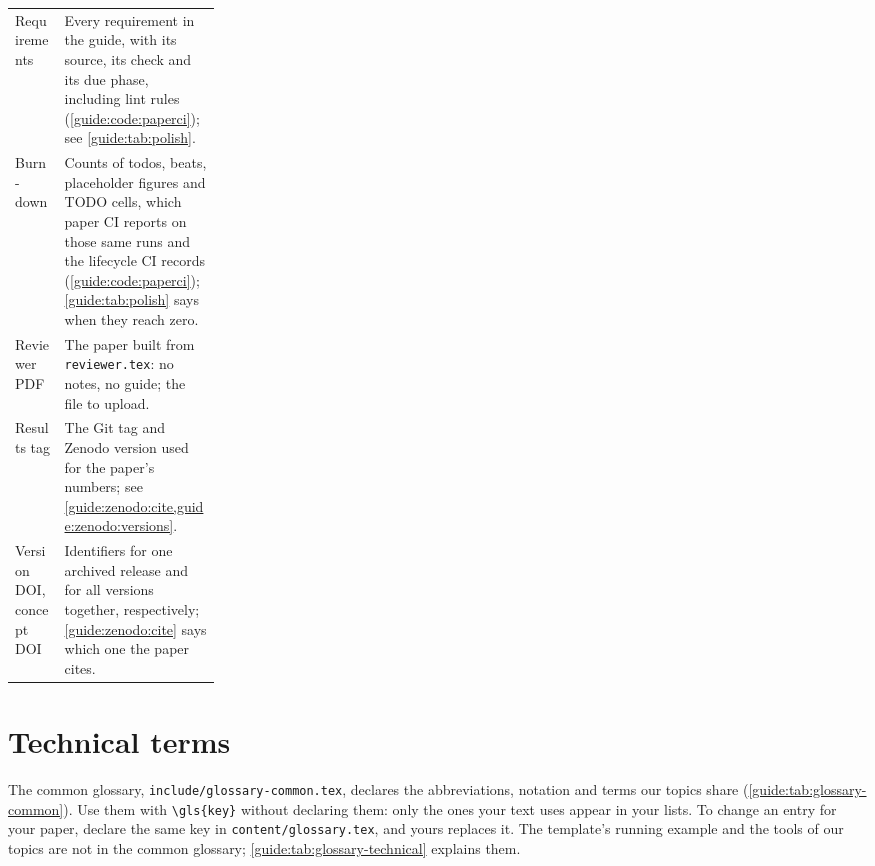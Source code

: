 {\begin{xltabular}{\linewidth}{>{\raggedright\arraybackslash}p{0.24\linewidth} X}
  Requirements & Every requirement in the guide, with its source, its check and its due phase, including lint rules (\cref{guide:code:paperci}); see \cref{guide:tab:polish}. \\
  Burn-down & Counts of todos, beats, placeholder figures and TODO cells, which paper CI reports on those same runs and the lifecycle CI records (\cref{guide:code:paperci}); \cref{guide:tab:polish} says when they reach zero. \\
  Reviewer PDF & The paper built from \texttt{reviewer.tex}: no notes, no guide; the file to upload. \\
  Results tag & The Git tag and Zenodo version used for the paper's numbers; see \cref{guide:zenodo:cite,guide:zenodo:versions}. \\
  Version DOI, concept DOI & Identifiers for one archived release and for all versions together, respectively; \cref{guide:zenodo:cite} says which one the paper cites. \\
\end{xltabular}
}

\section{Technical terms}
The common glossary, \texttt{include/glossary-common.tex}, declares the abbreviations, notation and terms our topics share (\cref{guide:tab:glossary-common}). Use them with \texttt{\textbackslash gls\{key\}} without declaring them: only the ones your text uses appear in your lists. To change an entry for your paper, declare the same key in \texttt{content/glossary.tex}, and yours replaces it. The template's running example and the tools of our topics are not in the common glossary; \cref{guide:tab:glossary-technical} explains them.

